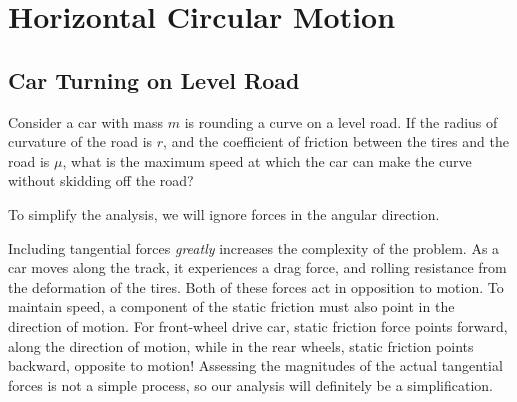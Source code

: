 %  
%    


\section{Horizontal Circular Motion}

\subsection{Car Turning on Level Road}

Consider a car with mass $m$ is rounding a curve on a level road. If the radius
of curvature of the road is $r$, and the coefficient of friction between the
tires and the road is $\mu$, what is the maximum speed at which the car can
make the curve without skidding off the road?
\begin{center}
\end{center}




To simplify the analysis, we will ignore forces in the angular direction.
\begin{remark}
  Including tangential forces \emph{greatly} increases the complexity of the
  problem. As a car moves along the track, it experiences a drag force, and
  rolling resistance from the deformation of the tires. Both of these forces
  act in opposition to motion. To maintain speed, a component of the static
  friction must also point in the direction of motion. For front-wheel drive
  car, static friction force points forward, along the direction of
  motion, while in the rear wheels, static friction points backward, opposite
  to motion! Assessing the magnitudes of the actual tangential forces is not a
  simple process, so our analysis will definitely be a simplification.
\end{remark}


